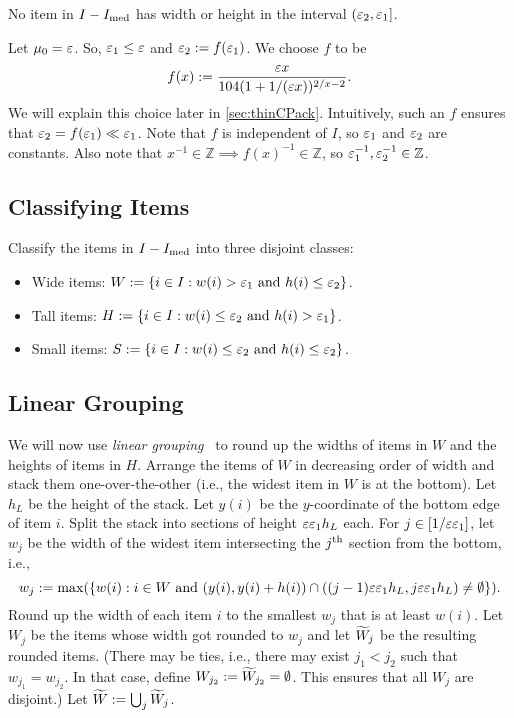 No item in $I - I_{\mathrm{med}}$ has width or height in the interval $(\varepsilon_2, \varepsilon_1]$.

Let $\mu_0 = \varepsilon$. So, $\varepsilon_1 \le \varepsilon$ and $\varepsilon_2 := f(\varepsilon_1)$.
We choose $f$ to be
\begin{equation}
\label{eqn:thin-bp:remmed-func}
f(x) := \frac{\varepsilon x}{104(1+1/(\varepsilon x))^{2/x-2}}.
\end{equation}
We will explain this choice later in \cref{sec:thinCPack}.
Intuitively, such an $f$ ensures that $\varepsilon_2 = f(\varepsilon_1) \ll \varepsilon_1$.
Note that $f$ is independent of $I$, so $\varepsilon_1$ and $\varepsilon_2$ are constants.
Also note that $x^{-1} \in \mathbb{Z} \implies f(x)^{-1} \in \mathbb{Z}$,
so $\varepsilon_1^{-1}, \varepsilon_2^{-1} \in \mathbb{Z}$.

\subsection{Classifying Items}

Classify the items in $I - I_{\mathrm{med}}$ into three disjoint classes:
\begin{itemize}
\item Wide items: $W := \{i \in I: w(i) > \varepsilon_1 \textrm{ and } h(i) \le \varepsilon_2 \}$.
\item Tall items: $H := \{i \in I: w(i) \le \varepsilon_2 \textrm{ and } h(i) > \varepsilon_1 \}$.
\item Small items: $S := \{i \in I: w(i) \le \varepsilon_2 \textrm{ and } h(i) \le \varepsilon_2 \}$.
\end{itemize}

\subsection{Linear Grouping}

We will now use \emph{linear grouping}~\cite{bp-aptas,kenyon1996strip}
to round up the widths of items in $W$ and the heights of items in $H$.
Arrange the items of $W$ in decreasing order of width and stack them
one-over-the-other (i.e., the widest item in $W$ is at the bottom).
Let $h_L$ be the height of the stack.
Let $y(i)$ be the $y$-coordinate of the bottom edge of item $i$.
Split the stack into sections of height $\varepsilon\varepsilon_1 h_L$ each.
For $j \in [1/\varepsilon\varepsilon_1]$, let $w_j$ be the width of the
widest item intersecting the $j^{\textrm{th}}$ section from the bottom, i.e.,
\[ w_j := \max(\{w(i): i \in W \textrm{ and } (y(i), y(i) + h(i))
    \cap ((j-1)\varepsilon\varepsilon_1 h_L, j\varepsilon\varepsilon_1 h_L) \neq \emptyset\}). \]
Round up the width of each item $i$ to the smallest $w_j$ that is at least $w(i)$.
Let $W_j$ be the items whose width got rounded to $w_j$
and let $\widetilde{W}_j$ be the resulting rounded items.
(There may be ties, i.e., there may exist $j_1 < j_2$ such that $w_{j_1} = w_{j_2}$.
In that case, define $W_{j_2} := \widetilde{W}_{j_2} = \emptyset$.
This ensures that all $W_j$ are disjoint.)
Let $\widetilde{W} := \bigcup_j \widetilde{W}_j$.

